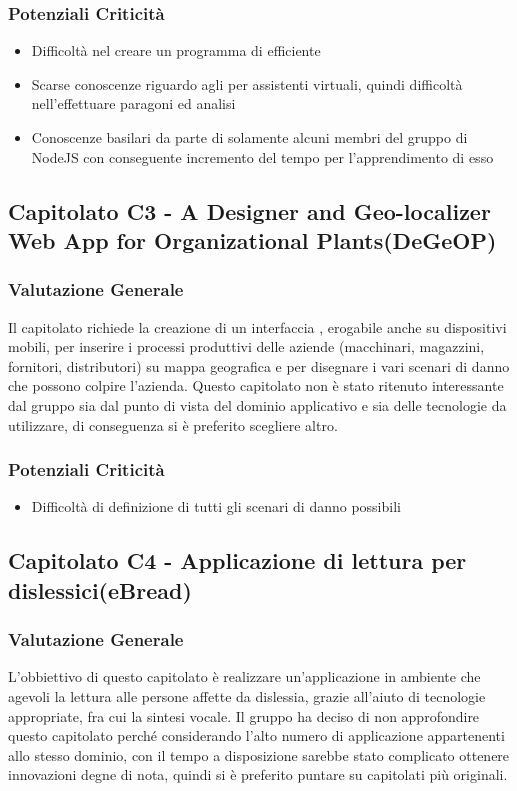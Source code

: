      \subsubsection{Potenziali Criticità}
      \begin{itemize}
       \item Difficoltà nel creare un programma di  efficiente
       \item Scarse conoscenze riguardo agli  per assistenti virtuali, quindi difficoltà nell'effettuare paragoni ed analisi
       \item Conoscenze basilari da parte di solamente alcuni membri del gruppo di NodeJS con conseguente incremento del tempo per l'apprendimento di esso
      \end{itemize}
  \subsection{Capitolato C3 - A Designer and Geo-localizer Web App for Organizational Plants(DeGeOP)}
    \subsubsection{Valutazione Generale}
    Il capitolato richiede la creazione di un interfaccia , erogabile anche su dispositivi mobili, per inserire i processi produttivi delle aziende (macchinari, magazzini, fornitori, distributori) su mappa geografica e per disegnare i vari scenari di danno che possono colpire l'azienda. 
    Questo capitolato non è stato ritenuto interessante dal gruppo sia dal punto di vista del dominio applicativo e sia delle tecnologie da utilizzare, di conseguenza si è preferito scegliere altro.
    \subsubsection{Potenziali Criticità}
    \begin{itemize}
     \item Difficoltà di definizione di tutti gli scenari di danno possibili
    \end{itemize}
\subsection{Capitolato C4 - Applicazione di lettura per dislessici(eBread)}
    \subsubsection{Valutazione Generale}
    L'obbiettivo di questo capitolato è realizzare un'applicazione in ambiente  che agevoli la lettura alle persone affette da dislessia, grazie all'aiuto di tecnologie appropriate, fra cui la sintesi vocale.
Il gruppo ha deciso di non approfondire questo capitolato perché considerando l'alto numero di applicazione appartenenti allo stesso dominio, con il tempo a disposizione sarebbe stato complicato ottenere innovazioni degne di nota, quindi si è preferito puntare su capitolati più originali.
